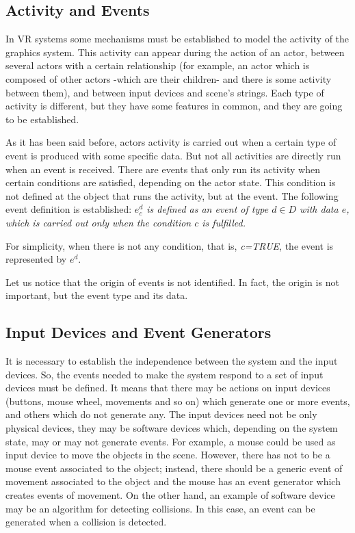 \documentclass[10pt,journal,letterpaper,compsoc]{IEEEtran}
\begin{document}
\subsection{Activity and Events
\label{sec:activity_events}}

In VR systems some mechanisms must be established to model the activity of the graphics system.
This activity can appear during the action of an actor, between several actors with a certain
relationship (for example, an actor which is composed of other actors -which are their children-
and there is some activity between them), and between input devices and scene's strings. Each type
of activity is different, but they have some features in common, and they are going to be
established.

As it has been said before, actors activity is carried out when a certain type of event is produced
with some specific data. But not all activities are directly run when an event is received. There
are events that only run its activity when certain conditions are satisfied, depending on the
actor state. This condition is not defined at the object that runs the activity, but at the event.
The following event definition is established:
{\itshape $e_c^d$ is defined as an event of type $d \in D$ with data $e$, which is carried out only when the
condition $c$ is fulfilled.
}

For simplicity, when there is not any condition, that is, {\itshape c=TRUE}, the event is
represented by $e^d$.

Let us notice that the origin of events is not identified. In fact, the origin is not
important, but the event type and its data.



\subsection{Input Devices and Event Generators
\label{sec:input_devices}}

It is necessary to establish the independence between the system and the input devices. So, the
events needed to make the system respond to a set of input devices must be defined. It means that
there may be actions on input devices (buttons, mouse wheel, movements and so on) which generate
one or more events, and others which do not generate any. The input devices need not be only
physical devices, they may be software devices which, depending on the system state, may or may not
generate events. For example, a mouse could be used as input device to move the objects in the
scene. However, there has not to be a mouse event associated to the object; instead, there should be
a generic event of movement associated to the object and the mouse has an event generator which
creates events of movement. On the other hand, an example of software device may be an algorithm
for detecting collisions. In this case, an event can be generated when a collision is detected.
\end{document}

